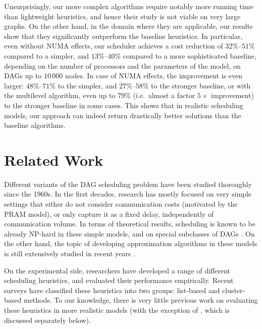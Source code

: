 \documentclass[sigconf,nonacm]{acmart}
\begin{document}
Unsurprisingly, our more complex algorithms require notably more running time than lightweight heuristics, and hence their study is not viable on very large graphs. On the other hand, in the domain where they are applicable, our results show that they significantly outperform the baseline heuristics. 
In particular, even without NUMA effects, our scheduler achieves a cost reduction of $32\%$--$51\%$ compared to a simpler, and $13\%$--$40\%$ compared to a more sophisticated baseline, depending on the number of processors and the parameters of the model, on DAGs up to $10_{\,}000$ nodes. In case of NUMA effects, the improvement is even larger: $48\%$--$71\%$ to the simpler, and $27\%$--$58\%$ to the stronger baseline, or with the multilevel algorithm, even up to $79\%$ (i.e.\ almost a factor $5\times$ improvement) to the stronger baseline in some cases. This shows that in realistic scheduling models, our approach can indeed return drastically better solutions than the baseline algorithms.

\section{Related Work}

Different variants of the DAG scheduling problem have been studied thoroughly since the 1960s. In the first decades, research has mostly focused on very simple settings that either do not consider communication costs (motivated by the PRAM model), or only capture it as a fixed delay, independently of communication volume. In terms of theoretical results, scheduling is known to be already NP-hard in these simple models, and on special subclasses of DAGs \cite{PRAMcomplexity1, PRAMcomplexity2, PRAMcomplexity3, CDcomplexity1, CDcomplexity2}. On the other hand, the topic of developing approximation algorithms in these models is still extensively studied in recent years \cite{approx1, approx2, approx3, approx4}.

On the experimental side, researchers have developed a range of different scheduling heuristics, and evaluated their performance empirically. Recent surveys \cite{schedsurvey} have classified these heuristics into two groups: list-based \cite{list1, list2, list3, list4, list5} and cluster-based \cite{clus1, clus2, clus3} methods. To our knowledge, there is very little previous work on evaluating these heuristics in more realistic models (with the exception of \cite{SPD}, which is discussed separately below).
\end{document}
